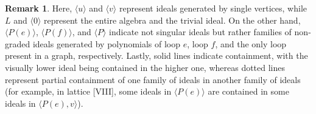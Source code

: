 \documentclass[12pt]{amsart}
\theoremstyle{plain} \numberwithin{equation}{section}
\theoremstyle{definition}
\newtheorem{remark}[theorem]{Remark}
\theoremstyle{definition}
\begin{document}
\begin{remark}
    Here, $\langle u \rangle$ and $\langle v \rangle$ represent ideals generated by single vertices, while $L$ and $\langle 0 \rangle$ represent the entire algebra and the trivial ideal. On the other hand, $\langle P(e) \rangle$, $\langle P(f) \rangle$, and $\langle P \rangle$ indicate not singular ideals but rather families of non-graded ideals generated by polynomials of loop $e$, loop $f$, and the only loop present in a graph, respectively. Lastly, solid lines indicate containment, with the visually lower ideal being contained in the higher one, whereas dotted lines represent partial containment of one family of ideals in another family of ideals (for example, in lattice [VIII], some ideals in $\langle P(e) \rangle$ are contained in some ideals in $\langle P(e), v \rangle$). 
\end{remark}
\end{document}
